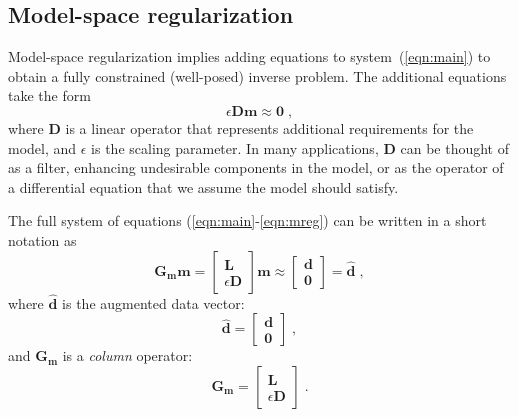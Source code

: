 \subsection{Model-space regularization}

Model-space regularization implies adding equations to
system~(\ref{eqn:main}) to obtain a fully constrained (well-posed)
inverse problem. The additional equations take the form
\begin{equation}
\epsilon \mathbf{D m \approx 0} \;,
\label{eqn:mreg}
\end{equation}
where $\mathbf{D}$ is a linear operator that represents additional
requirements for the model, and $\epsilon$ is the scaling parameter.
In many applications, $\mathbf{D}$ can be thought of as a filter,
enhancing undesirable components in the model, or as the operator of
a differential equation that we assume the model should satisfy.

The full system of equations (\ref{eqn:main}-\ref{eqn:mreg}) can be
written in a short notation as
\begin{equation}
  \mathbf{G_m m} = \left[\begin{array}{c} \mathbf{L} \\ \epsilon \mathbf{D}
    \end{array}\right] \mathbf{m} \approx
  \left[\begin{array}{c} \mathbf{d} \\ \mathbf{0} \end{array}\right] = 
  \hat{\mathbf{d}}\;,
\label{eqn:main-m}
\end{equation}
where $\hat{\mathbf{d}}$ is the augmented data vector:
\begin{equation}
\hat{\mathbf{d}} = \left[\begin{array}{c} \mathbf{d} \\ \mathbf{0} 
  \end{array}\right]\;,
\label{eqn:dhat}
\end{equation}
and $\mathbf{G_m}$ is a \emph{column} operator:
\begin{equation}
\mathbf{G_m} = \left[\begin{array}{c} \mathbf{L} \\ \epsilon \mathbf{D}
  \end{array}\right]\;.
\label{eqn:gm}
\end{equation}

